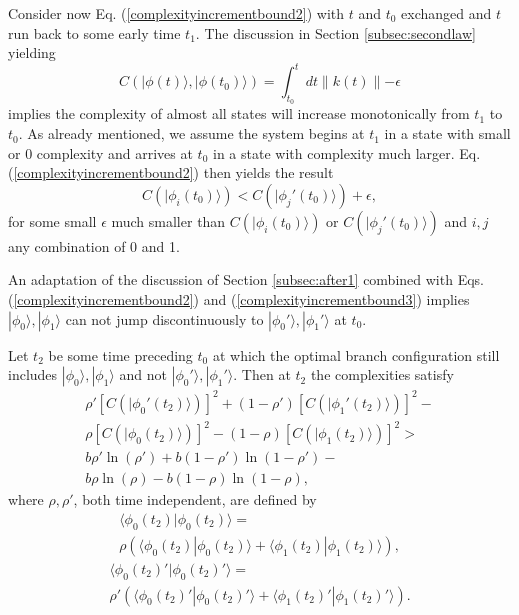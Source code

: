 \documentclass[12pt,amsmath,amssymb,onecolumn]{revtex4-2}
\begin{document}
Consider now Eq. (\ref{complexityincrementbound2}) with
$t$ and $t_0$ exchanged and $t$ run back to some early time
$t_1$.  The
discussion in Section \ref{subsec:secondlaw}
yielding
\begin{equation}
  \label{complexityincrement2x}
  C( |\phi(t) \rangle , |\phi(t_0) \rangle ) = \int_{t_0}^t dt \parallel k(t) \parallel - \epsilon
\end{equation}
implies the complexity of almost all states will
increase monotonically from $t_1$ to $t_0$.
As already mentioned, we assume the system
begins at $t_1$ in a state with small or 0 complexity
and arrives at $t_0$ in a state with complexity
much larger.  Eq. (\ref{complexityincrementbound2})
then yields the result
\begin{equation}
  \label{complexityincrementbound3}
  C(|\phi_i(t_0) \rangle ) < C(|\phi_j'(t_0) \rangle ) + \epsilon,
\end{equation}
for some small $\epsilon$ much smaller than
$C(|\phi_i(t_0) \rangle )$ or $C(|\phi_j'(t_0) \rangle )$
and $i, j$  any combination of 0 and 1.

An adaptation of the discussion of
Section \ref{subsec:after1} combined with
Eqs. (\ref{complexityincrementbound2}) and
(\ref{complexityincrementbound3})
implies $|\phi_0 \rangle , |\phi_1 \rangle $
can not jump discontinuously to
$|\phi_0' \rangle , |\phi_1' \rangle $ at $t_0$.

Let $t_2$ be some time preceding $t_0$ at which
the optimal branch configuration still includes 
$|\phi_0 \rangle , |\phi_1 \rangle $
and not
$|\phi_0' \rangle , |\phi_1' \rangle $.
Then at $t_2$
the complexities satisfy
\begin{multline}
  \label{splitcondition3}
  \rho' [C( |\phi_0'(t_2) \rangle )]^2 + ( 1 - \rho') [C( |\phi_1'(t_2) \rangle )]^2 - \\
  \rho [C( |\phi_0(t_2) \rangle )]^2 - ( 1 - \rho) [C( |\phi_1(t_2) \rangle )]^2 > \\
 b \rho' \ln( \rho') + b ( 1 - \rho') \ln( 1 - \rho') - \\
 b \rho \ln( \rho) - b ( 1 - \rho) \ln( 1 - \rho),
\end{multline}
where $\rho, \rho'$, both time independent, are defined by
\begin{multline}
    \label{rho2}
     \langle  \phi_0(t_2) | \phi_0(t_2) \rangle  = \\ \rho ( \langle  \phi_0(t_2) | \phi_0(t_2) \rangle  +  \langle \phi_1(t_2)|\phi_1(t_2) \rangle ),
\end{multline}
\begin{multline}
    \label{rho2prime}
     \langle  \phi_0(t_2)' | \phi_0(t_2)' \rangle  = \\ \rho' ( \langle  \phi_0(t_2)' | \phi_0(t_2)' \rangle  +  \langle \phi_1(t_2)'|\phi_1(t_2)' \rangle ).
\end{multline}
\end{document}
